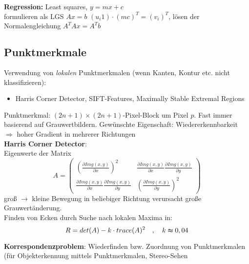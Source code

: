 \textbf{Regression:}
Least squares, $y = mx + c$ \\
formulieren als LGS $Ax = b$ $(u_i 1) \cdot (m c)^T = (v_i)^T$, lösen der Normalengleichung $A^TAx=A^Tb$

\subsection{Punktmerkmale}

Verwendung von \textsl{lokalen} Punktmerkmalen (wenn Kanten, Kontur etc. nicht klassifizieren):
\begin{itemize}
\item Harris Corner Detector, SIFT-Features, Maximally Stable Extremal Regions
\end{itemize}
Punktmerkmal: $(2n+1) \times (2n+1)$-Pixel-Block um Pixel $p$. Fast immer basierend auf Grauwertbildern. Gewünschte Eigenschaft: Wiedererkennbarkeit \\ $\Rightarrow$ hoher Gradient in mehrerer Richtungen \\[0,1cm]
\textbf{Harris Corner Detector}: \\
Eigenwerte der Matrix $$A = \left( \begin{array}{cc} \left( \frac{\partial Img(x,y)}{\partial x} \right)^2 & \frac{\partial Img(x,y)}{\partial x} \frac{\partial Img(x,y)}{\partial y} \\ \frac{\partial Img(x,y)}{\partial x} \frac{\partial Img(x,y)}{\partial y} & \left( \frac{\partial Img(x,y)}{\partial y} \right)^2 \end{array} \right)$$ groß $\to$ kleine Bewegung in beliebiger Richtung verursacht große Grauwertänderung. \\ Finden von Ecken durch Suche nach lokalen Maxima in: $$R = det(A) - k \cdot trace(A)^2 \quad , \quad k \thickapprox 0,04$$

\textbf{Korrespondenzproblem}: Wiederfinden bzw. Zuordnung von Punktmerkmalen (für Objekterkennung mittels Punktmerkmalen, Stereo-Sehen

